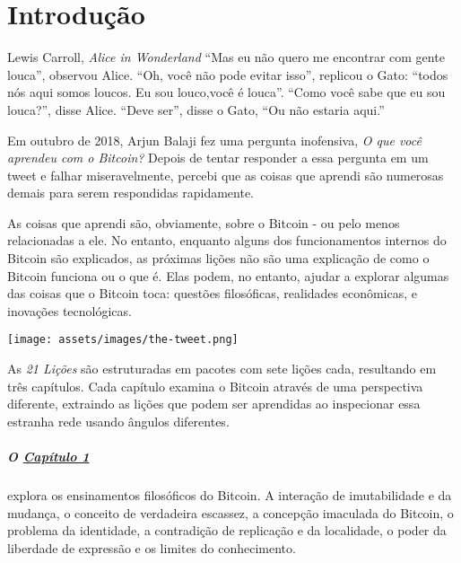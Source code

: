 \chapter*{Introdução}
\label{ch:introduction}

\begin{chapquote}{Lewis Carroll, \textit{Alice in Wonderland}}
\enquote{Mas eu não quero me encontrar com gente louca}, observou Alice. \enquote{Oh, você não pode evitar isso}, replicou o Gato: \enquote{todos nós aqui somos loucos. Eu sou louco,você é louca}. \enquote{Como você sabe que eu sou louca?}, disse Alice. \enquote{Deve ser}, disse o Gato, \enquote{Ou não estaria aqui.}
\end{chapquote}

Em outubro de 2018, Arjun Balaji fez uma pergunta inofensiva, \textit {O que você aprendeu com o Bitcoin?} Depois de tentar responder a essa pergunta em um tweet e falhar miseravelmente, percebi que as coisas que aprendi são numerosas demais para serem respondidas rapidamente.

As coisas que aprendi são, obviamente, sobre o Bitcoin - ou pelo menos relacionadas a ele. No entanto, enquanto alguns dos funcionamentos internos do Bitcoin são explicados, as próximas lições não são uma explicação de como o Bitcoin funciona ou o que é. Elas podem, no entanto, ajudar a explorar algumas das coisas que o Bitcoin toca: questões filosóficas, realidades econômicas, e inovações tecnológicas.

\begin{center}
  \texttt{[image: assets/images/the-tweet.png]}
\end{center}

As \textit {21 Lições} são estruturadas em pacotes com sete lições cada, resultando em três capítulos. Cada capítulo examina o Bitcoin através de uma perspectiva diferente, extraindo as lições que podem ser aprendidas ao inspecionar essa estranha rede usando ângulos diferentes.

\paragraph{O \hyperref[ch: philosophy]{Capítulo 1}}{explora os ensinamentos filosóficos do Bitcoin. A interação de imutabilidade e da mudança, o conceito de verdadeira escassez, a concepção imaculada do Bitcoin, o problema da identidade, a contradição de replicação e da localidade, o poder da liberdade de expressão e os limites do conhecimento. }

